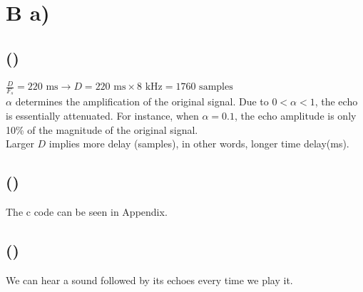 \documentclass{article}
\newenvironment{homeworkProblem}[1]{
	\section*{#1}
	}{
}
\newenvironment{homeworkSection}[1]{
	\subsection*{#1}
	}{
}
\begin{document}
\begin{homeworkProblem}{B a)}
\begin{homeworkSection}{()}
$\frac{D}{F_s}=\text{220 ms} \longrightarrow D = 220 \text{ ms} \times 8\text{ kHz} = 1760 \text{ samples}$\\

$\alpha$ determines the amplification of the original signal. Due to $0< \alpha <1$, the echo is essentially attenuated. For instance, when $\alpha=0.1$, the echo amplitude is only 10\% of the magnitude of the original signal.\\

Larger $D$ implies more delay (samples), in other words, longer time delay(ms).

\end{homeworkSection}


\begin{homeworkSection}{()}
The c code can be seen in Appendix. 
\end{homeworkSection}


\begin{homeworkSection}{()}
We can hear a sound followed by its echoes every time we play it.
\end{homeworkSection}


\end{homeworkProblem}

\end{document}
